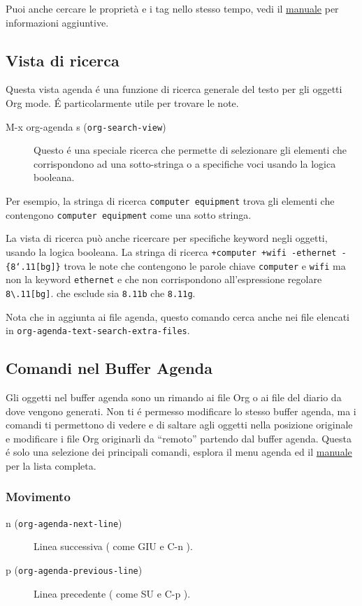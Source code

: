 \documentclass[11pt]{article}
\begin{document}
Puoi anche cercare le proprietà e i tag nello stesso tempo, vedi il
\href{manul}{manuale} per informazioni aggiuntive.

\subsection{Vista di ricerca}
\label{sec:orga46d33a}
Questa vista agenda é una funzione di ricerca generale del testo per
gli oggetti Org mode. É particolarmente utile per trovare le note.

\begin{description}
\item[{M-x org-agenda s (\texttt{org-search-view})}] Questo é una speciale ricerca che permette di selezionare gli
elementi che corrispondono ad una sotto-stringa o a specifiche voci
usando la logica booleana.
\end{description}

Per esempio, la stringa di ricerca \texttt{computer equipment} trova gli
elementi che contengono \texttt{computer equipment} come una sotto stringa.

La vista di ricerca può anche ricercare per specifiche keyword negli
oggetti, usando la logica booleana. La stringa di ricerca \texttt{+computer
+wifi -ethernet -\{8`.11[bg]\}} trova le note che contengono le parole
chiave \texttt{computer} e \texttt{wifi} ma non la keyword \texttt{ethernet} e che non
corrispondono all'espressione regolare \texttt{8\textbackslash{}.11[bg]}. che esclude sia
\texttt{8.11b} che \texttt{8.11g}.

Nota che in aggiunta ai file agenda, questo comando cerca anche nei
file elencati in \texttt{org-agenda-text-search-extra-files}.

\subsection[Agenda Commands]{Comandi nel Buffer Agenda}
\label{sec:orge996076}
Gli oggetti nel buffer agenda sono un rimando ai file Org o ai file
del diario da dove vengono generati. Non ti é permesso modificare lo
stesso buffer agenda, ma i comandi ti permettono di vedere e di
saltare agli oggetti nella posizione originale e modificare i file Org
originarli da ``remoto'' partendo dal buffer agenda. Questa é solo una
selezione dei principali comandi, esplora il menu agenda ed il \href{manual}{manuale}
per la lista completa.

\subsubsection*{Movimento}
\label{sec:org2d2a500}
\begin{description}
\item[{n (\texttt{org-agenda-next-line})}] Linea successiva ( come GIU e C-n ).

\item[{p (\texttt{org-agenda-previous-line})}] Linea precedente ( come SU e C-p ).
\end{description}
\end{document}
